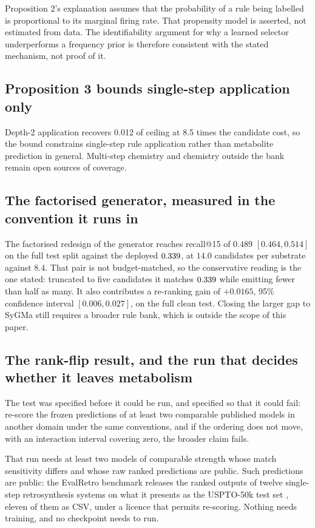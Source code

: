 Proposition 2's explanation assumes that the probability of a rule being labelled is proportional
to its marginal firing rate. That propensity model is asserted, not estimated from data.
The identifiability argument for why a learned selector underperforms a frequency prior is
therefore consistent with the stated mechanism, not proof of it.

\subsection{Proposition 3 bounds single-step application only}

Depth-2 application recovers 0.012 of ceiling at 8.5 times the candidate cost, so the bound
constrains single-step rule application rather than metabolite prediction in general. Multi-step
chemistry and chemistry outside the bank remain open sources of coverage.

\subsection{The factorised generator, measured in the convention it runs in}

The factorised redesign of the generator reaches recall@15 of $0.489$ $[0.464,0.514]$ on the full
test split against the deployed $0.339$, at $14.0$ candidates per substrate against $8.4$.
That pair is not budget-matched, so the conservative reading is the one stated: truncated to five
candidates it matches $0.339$ while emitting fewer than half as many. It also contributes a
re-ranking gain of $+0.0165$, 95\% confidence interval $[0.006,0.027]$, on the full clean test.
Closing the larger gap to SyGMa still requires a broader rule bank, which is outside the scope of
this paper.

\subsection{The rank-flip result, and the run that decides whether it leaves metabolism}
\label{app:xdomainflip}

The test was specified before it could be run, and specified so that it could fail: re-score the
frozen predictions of at least two comparable published models in another domain under the same
conventions, and if the ordering does not move, with an interaction interval covering zero, the
broader claim fails.

That run needs at least two models of comparable strength whose match sensitivity differs and
whose raw ranked predictions are public. Such predictions are public: the EvalRetro benchmark
releases the ranked outputs of twelve single-step retrosynthesis systems on what it presents as the
USPTO-50k test set \citep{Hastedt_2024}, eleven of them as CSV, under a licence that permits
re-scoring. Nothing needs training, and no checkpoint needs to run.

